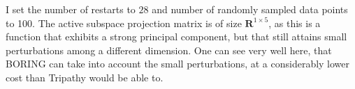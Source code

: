 I set the number of restarts to $28$ and number of randomly sampled data points to 100.
The active subspace projection matrix is of size $\mathbf{R}^{1\times 5}$, as this is a function that exhibits a strong principal component, but that still attains small perturbations among a different dimension.
One can see very well here, that BORING can take into account the small perturbations, at a considerably lower cost than Tripathy would be able to.

